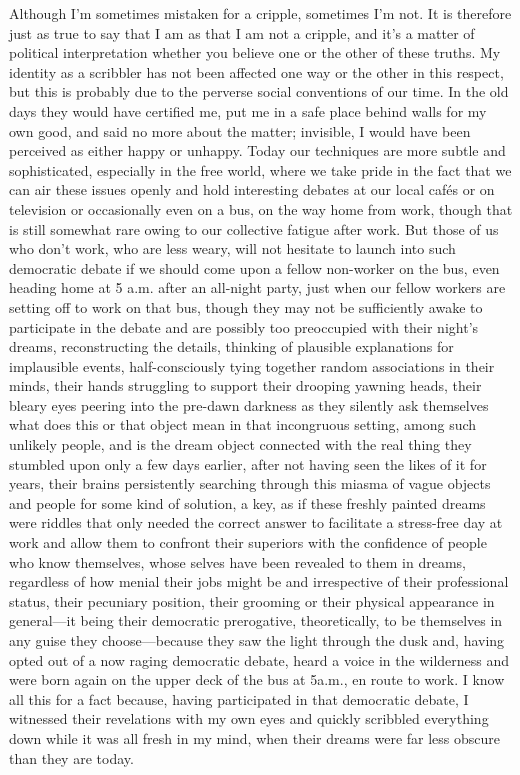 \documentclass[
]{memoir}
\begin{document}
Although I'm sometimes mistaken for a cripple, sometimes I'm not. It is
therefore just as true to say that I am as that I am not a cripple, and
it's a matter of political interpretation whether you believe one or the
other of these truths. My identity as a scribbler has not been affected
one way or the other in this respect, but this is probably due to the
perverse social conventions of our time. In the old days they would have
certified me, put me in a safe place behind walls for my own good, and
said no more about the matter; invisible, I would have been perceived as
either happy or unhappy. Today our techniques are more subtle and
sophisticated, especially in the free world, where we take pride in the
fact that we can air these issues openly and hold interesting debates at
our local cafés or on television or occasionally even on a bus, on the
way home from work, though that is still somewhat rare owing to our
collective fatigue after work. But those of us who don't work, who are
less weary, will not hesitate to launch into such democratic debate if
we should come upon a fellow non-worker on the bus, even heading home at
5 a.m. after an all-night party, just when our fellow workers are
setting off to work on that bus, though they may not be sufficiently
awake to participate in the debate and are possibly too preoccupied with
their night's dreams, reconstructing the details, thinking of plausible
explanations for implausible events, half-consciously tying together
random associations in their minds, their hands struggling to support
their drooping yawning heads, their bleary eyes peering into the
pre-dawn darkness as they silently ask themselves what does this or that
object mean in that incongruous setting, among such unlikely people, and
is the dream object connected with the real thing they stumbled upon
only a few days earlier, after not having seen the likes of it for
years, their brains persistently searching through this miasma of vague
objects and people for some kind of solution, a key, as if these freshly
painted dreams were riddles that only needed the correct answer to
facilitate a stress-free day at work and allow them to confront their
superiors with the confidence of people who know themselves, whose
selves have been revealed to them in dreams, regardless of how menial
their jobs might be and irrespective of their professional status, their
pecuniary position, their grooming or their physical appearance in
general---it being their democratic prerogative, theoretically, to be
themselves in any guise they choose---because they saw the light through
the dusk and, having opted out of a now raging democratic debate, heard
a voice in the wilderness and were born again on the upper deck of the
bus at 5a.m., en route to work. I know all this for a fact because,
having participated in that democratic debate, I witnessed their
revelations with my own eyes and quickly scribbled everything down while
it was all fresh in my mind, when their dreams were far less obscure
than they are today.
\end{document}
